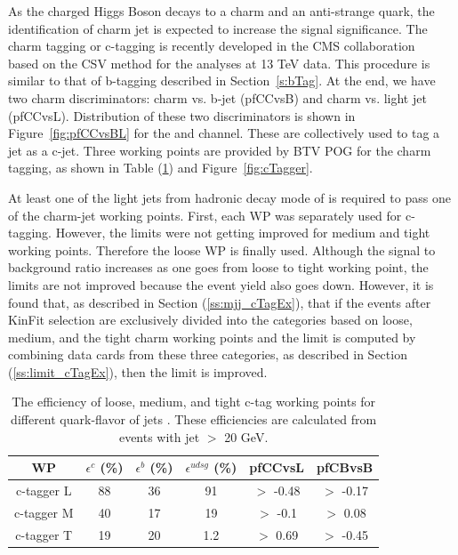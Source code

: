 
As the charged Higgs Boson decays to a charm and an anti-strange quark, the
identification of charm jet is expected to increase the signal significance.
The charm tagging or c-tagging is recently developed in the CMS collaboration
~\cite{CMS-PAS-BTV-16-001} based on the CSV method for the analyses at 13 TeV 
data. This procedure is similar to that of b-tagging described in 
Section~\ref{s:bTag}. At the end, we have two charm discriminators: charm 
vs. b-jet (pfCCvsB) and charm vs. light jet (pfCCvsL). Distribution of these 
two discriminators is shown in Figure~\ref{fig:pfCCvsBL} for the \mujets and
\ejets channel. These are collectively used to tag a jet as a c-jet.
Three working points are provided by BTV POG for the charm tagging, as shown 
in Table (\ref{tab:cTagEff}) and Figure~\ref{fig:cTagger}.

At least one of the light jets from hadronic decay mode of \ttbar is required 
to pass one of the charm-jet working points. First, each WP was separately used
for c-tagging. However, the limits were not getting improved for medium and tight 
working points. Therefore the loose WP is finally used. Although the signal to
background ratio increases as one goes from loose to tight working point, 
the limits are not improved because the event yield also goes down. However,
it is found that, as described in Section (\ref{ss:mjj_cTagEx}), that if the 
events after KinFit selection are exclusively divided into the categories 
based on loose, medium, and the tight charm working points and the limit is 
computed by combining data cards from these three categories, as described in 
Section (\ref{ss:limit_cTagEx}), then the limit is improved.
\begin{table}
\caption{The efficiency of loose, medium, and tight c-tag working points for
    different quark-flavor of jets \cite{Sirunyan:2017ezt}. These efficiencies 
    are calculated from
\ttbar events with jet \pt $>$ 20 GeV.}
\label{tab:cTagEff}
\begin{center}
\begin{tabular}{cccccc}
\hline
\hline
WP & $\epsilon^c$ (\%) & $\epsilon^b$ (\%) & $\epsilon^{udsg}$ (\%) & pfCCvsL & pfCBvsB\\ \hline\hline
c-tagger L & 88 & 36 & 91 & $>$ -0.48 & $>$ -0.17 \\
c-tagger M & 40 & 17 & 19 & $>$ -0.1  & $>$  0.08 \\
c-tagger T & 19 & 20 & 1.2& $>$ 0.69  & $>$ -0.45 \\
\hline
\end{tabular}
\end{center}
\end{table}
